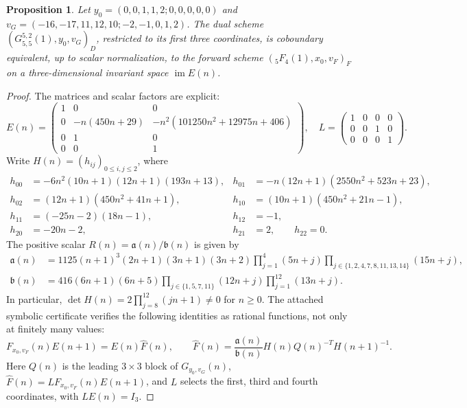 \documentclass[11pt]{article}
\newtheorem{proposition}{Proposition}
\begin{document}
\begin{proposition}
\label{prop:z34-coboundary}
Let $y_0=(0,0,1,1,2;0,0,0,0,0)$ and
$v_G=(-16,-17,11,12,10;-2,-1,0,1,2)$.
The dual scheme $(G^{5,2}_{5,5}(1),y_0,v_G)_D$, restricted to its first
three coordinates, is coboundary equivalent, up to scalar normalization,
to the forward scheme $({}_5F_4(1),x_0,v_F)_F$ on a three-dimensional
invariant space $\operatorname{im}E(n)$.
\end{proposition}

\begin{proof}

The matrices and scalar factors are explicit:
\[
 E(n)=\begin{pmatrix}
 1&0&0\\
 0&-n(450n+29)&-n^2(101250n^2+12975n+406)\\
 0&1&0\\0&0&1
 \end{pmatrix},\quad
 L=\begin{pmatrix}1&0&0&0\\0&0&1&0\\0&0&0&1\end{pmatrix}.
\]
Write $H(n)=(h_{ij})_{0\leq i,j\leq2}$, where
\begin{align*}
 h_{00}&=-6n^2(10n+1)(12n+1)(193n+13),&
 h_{01}&=-n(12n+1)(2550n^2+523n+23),\\
 h_{02}&=(12n+1)(450n^2+41n+1),&
 h_{10}&=(10n+1)(450n^2+21n-1),\\
 h_{11}&=(-25n-2)(18n-1),&h_{12}&=-1,\\
 h_{20}&=-20n-2,&h_{21}&=2,\qquad h_{22}=0.
\end{align*}
The positive scalar $R(n)=\mathfrak a(n)/\mathfrak b(n)$ is given by
\begin{align*}
 \mathfrak a(n)&=1125(n+1)^3(2n+1)(3n+1)(3n+2)
 \prod_{j=1}^4(5n+j)
 \prod_{j\in\{1,2,4,7,8,11,13,14\}}(15n+j),\\
 \mathfrak b(n)&=416(6n+1)(6n+5)
 \prod_{j\in\{1,5,7,11\}}(12n+j)
 \prod_{j=1}^{12}(13n+j).
\end{align*}
In particular, $\det H(n)=2\prod_{j=8}^{12}(jn+1)\ne0$ for $n\geq0$.
The attached symbolic certificate verifies the following identities
as rational functions, not only at finitely many values:
\[
F_{x_0,v_F}(n)E(n+1)=E(n)\widehat F(n),
\qquad
\widehat F(n)=\frac{\mathfrak a(n)}{\mathfrak b(n)}H(n)Q(n)^{-T}H(n+1)^{-1}.
\]
Here $Q(n)$ is the leading $3\times3$ block of $G_{y_0,v_G}(n)$,
$\widehat F(n)=LF_{x_0,v_F}(n)E(n+1)$, and $L$ selects the first, third
and fourth coordinates, with $LE(n)=I_3$.

\end{proof}
\end{document}
